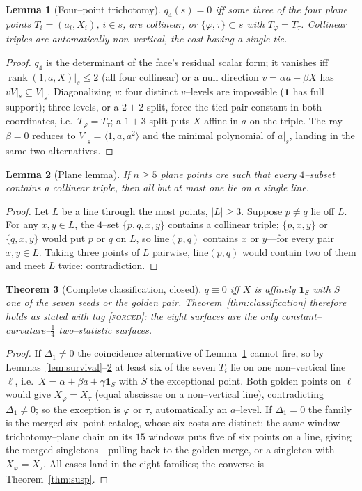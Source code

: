 \documentclass[11pt]{article}
\newtheorem{theorem}{Theorem}[section]
\newtheorem{lemma}[theorem]{Lemma}
\theoremstyle{definition}
\newcommand{\ph}{\varphi}
\newcommand{\forcedtag}{{\scshape [forced]}}
\begin{document}
\begin{lemma}[Four--point trichotomy]\label{lem:tri}
$q_4(s)=0$ iff some three of the four plane points $T_i=(a_i,X_i)$, $i\in s$, are collinear, or
$\{\ph,\tau\}\subset s$ with $T_\ph=T_\tau$. Collinear triples are automatically non--vertical, the
cost having a single tie.
\end{lemma}
\begin{proof}
$q_4$ is the determinant of the face's residual scalar form; it vanishes iff
$\operatorname{rank}(1,a,X)|_s\le2$ (all four collinear) or a null direction $v=\alpha a+\beta X$ has
$vV|_s\subseteq V|_s$. Diagonalizing $v$: four distinct $v$--levels are impossible ($\mathbf 1$ has
full support); three levels, or a $2{+}2$ split, force the tied pair constant in both coordinates,
i.e.\ $T_\ph=T_\tau$; a $1{+}3$ split puts $X$ affine in $a$ on the triple. The ray $\beta=0$ reduces
to $V|_s=\langle1,a,a^2\rangle$ and the minimal polynomial of $a|_s$, landing in the same two
alternatives.
\end{proof}

\begin{lemma}[Plane lemma]\label{lem:plane}
If $n\ge5$ plane points are such that every $4$--subset contains a collinear triple, then all but at
most one lie on a single line.
\end{lemma}
\begin{proof}
Let $L$ be a line through the most points, $|L|\ge3$. Suppose $p\ne q$ lie off $L$. For any
$x,y\in L$, the $4$--set $\{p,q,x,y\}$ contains a collinear triple; $\{p,x,y\}$ or $\{q,x,y\}$ would
put $p$ or $q$ on $L$, so $\mathrm{line}(p,q)$ contains $x$ or $y$---for every pair $x,y\in L$.
Taking three points of $L$ pairwise, $\mathrm{line}(p,q)$ would contain two of them and meet $L$
twice: contradiction.
\end{proof}

\begin{theorem}[Complete classification, closed]\label{thm:classfull}
$q\equiv0$ iff $X$ is affinely $\mathbf 1_S$ with $S$ one of the seven seeds or the golden pair.
Theorem~\ref{thm:classification} therefore holds as stated with tag \forcedtag: the eight surfaces
are the only constant--curvature--$\tfrac14$ two--statistic surfaces.
\end{theorem}
\begin{proof}
If $\Delta_1\ne0$ the coincidence alternative of Lemma~\ref{lem:tri} cannot fire, so by
Lemmas~\ref{lem:survival}--\ref{lem:plane} at least six of the seven $T_i$ lie on one non--vertical
line $\ell$, i.e.\ $X=\alpha+\beta a+\gamma\mathbf 1_S$ with $S$ the exceptional point. Both golden
points on $\ell$ would give $X_\ph=X_\tau$ (equal abscissae on a non--vertical line), contradicting
$\Delta_1\ne0$; so the exception is $\ph$ or $\tau$, automatically an $a$--level. If $\Delta_1=0$ the
family is the merged six--point catalog, whose six costs are distinct; the same
window--trichotomy--plane chain on its $15$ windows puts five of six points on a line, giving the
merged singletons---pulling back to the golden merge, or a singleton with $X_\ph=X_\tau$. All cases
land in the eight families; the converse is Theorem~\ref{thm:susp}.
\end{proof}
\end{document}

